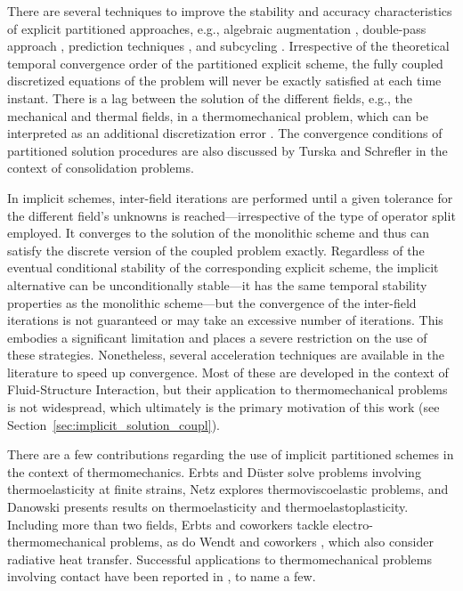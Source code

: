 There are several techniques to improve the stability and accuracy characteristics of explicit partitioned approaches, e.g., algebraic augmentation \citep{park_stabilization_1977, park_stabilization_1983}, double-pass approach \citep{armero_new_1992, piperno_explicitimplicit_1997, farhat_provably_2006, farhat_robust_2010}, prediction techniques \citep{piperno_explicitimplicit_1997, piperno_partitioned_2001, michler_efficient_2005, farhat_provably_2006}, and subcycling \citep{piperno_partitioned_1995, farhat_high_1997, piperno_explicitimplicit_1997}.
Irrespective of the theoretical temporal convergence order of the partitioned explicit scheme, the fully coupled discretized equations of the problem will never be exactly satisfied at each time instant.
There is a lag between the solution of the different fields, e.g., the mechanical and thermal fields, in a thermomechanical problem, which can be interpreted as an additional discretization error \citep{michler_efficient_2005}.
The convergence conditions of partitioned solution procedures are also discussed by Turska and Schrefler \citep{turskaConvergenceConditionsPartitioned1993a} in the context of consolidation problems.

In implicit schemes, inter-field iterations are performed until a given tolerance for the different field's unknowns is reached---irrespective of the type of operator split employed.
It converges to the solution of the monolithic scheme and thus can satisfy the discrete version of the coupled problem exactly.
Regardless of the eventual conditional stability of the corresponding explicit scheme, the implicit alternative can be unconditionally stable---it has the same temporal stability properties as the monolithic scheme---but the convergence of the inter-field iterations is not guaranteed or may take an excessive number of iterations.
This embodies a significant limitation and places a severe restriction on the use of these strategies.
Nonetheless, several acceleration techniques are available in the literature to speed up convergence.
Most of these are developed in the context of Fluid-Structure Interaction, but their application to thermomechanical problems is not widespread, which ultimately is the primary motivation of this work (see Section~\ref{sec:implicit_solution_coupl}).

There are a few contributions regarding the use of implicit partitioned schemes in the context of thermomechanics.
Erbts and Düster \citep{erbts_accelerated_2012} solve problems involving thermoelasticity at finite strains, Netz \citep{netz_high-order_2013} explores thermoviscoelastic problems, and Da\-now\-ski \citep{danowski_computational_2014} presents results on thermoelasticity and thermoelastoplasticity.
Including more than two fields, Erbts and coworkers \citep{erbts_partitioned_2015} tackle electro-thermomechanical problems, as do Wendt and coworkers \citep{wendt_partitioned_2015}, which also consider radiative heat transfer.
Successful applications to thermomechanical problems involving contact have been reported in \citet{johansson_thermoelastic_1993,rieger2004AdaptiveMethodsThermomechanical,temizer2011ThermomechanicalContactHomogenization,kruger2020PorousductileFractureThermoelastoplastic}, to name a few.

